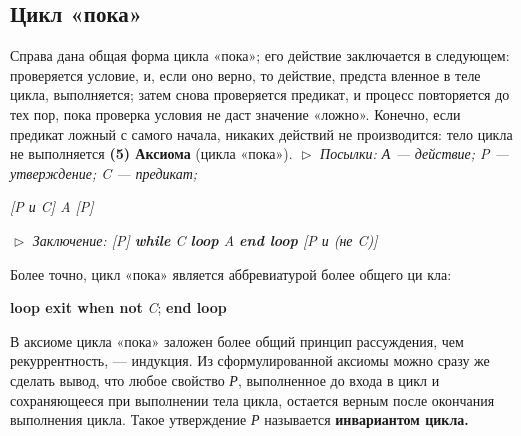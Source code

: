 \subsection{Цикл «пока»}
\noindent Справа  дана  общая  форма  цикла  «пока»;  его 
действие заключается в следующем: проверяется 
условие, и, если оно верно, то действие, предста­
вленное в теле цикла, выполняется; затем снова 
проверяется предикат, и процесс повторяется до
тех пор, пока проверка условия не даст значение «ложно». Конечно, если 
предикат ложный с самого начала, никаких действий не производится: 
тело цикла не выполняется
\newline
\textbf{(5) Аксиома} (цикла «пока»).
\newline
$\vartriangleright$ \textit{Посылки: А --- действие; P --- утверждение; C --- предикат;}
\begin{center}
\textit{[P и C] A [P]}
\end{center}
$\vartriangleright$ \textit{Заключение:  \textit{[P]} \textbf{while} \textit{C} \textbf{loop} \textit{A} \textbf{end loop} \textit{[P и (не C)]}}

\parindent=1cm Более точно, цикл «пока» является аббревиатурой более общего ци­
кла:
\begin{center}
\textbf{loop exit when not} \textit{C};  \textbf{end loop} 
\end{center}
В аксиоме цикла «пока» заложен более общий принцип рассуждения, чем 
рекуррентность,  — индукция.  Из  сформулированной аксиомы можно 
сразу же сделать вывод, что любое свойство \textit{Р}, выполненное до входа 
в цикл и сохраняющееся при выполнении тела цикла, остается верным 
после окончания выполнения цикла. Такое утверждение \textit{Р} называется 
\textbf{инвариантом цикла.}

